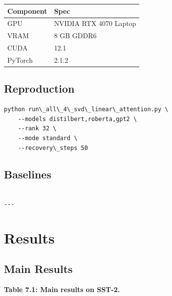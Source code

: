 \begin{table}[H]
\centering
\small
\begin{tabular}{ll}
\toprule
\textbf{Component} & \textbf{Spec} \\
\midrule
GPU & NVIDIA RTX 4070 Laptop \\
VRAM & 8 GB GDDR6 \\
CUDA & 12.1 \\
PyTorch & 2.1.2 \\
\bottomrule
\end{tabular}
\end{table}

\subsection{Reproduction}

\begin{lstlisting}
python run\_all\_4\_svd\_linear\_attention.py \
    --models distilbert,roberta,gpt2 \
    --rank 32 \
    --mode standard \
    --recovery\_steps 50
\end{lstlisting}

\subsection{Baselines}

\begin{lstlisting}

---
\end{lstlisting}


\section{Results}

\subsection{Main Results}

\textbf{Table 7.1: Main results on SST-2.}

